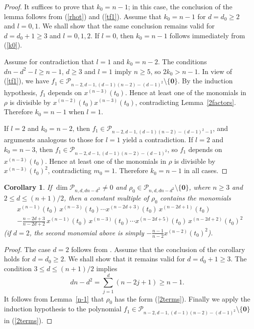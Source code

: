 \documentclass[11pt]{amsart}
\numberwithin{equation}{section}
\newtheorem{cor}[thm]{Corollary}
\newcommand{\scp}{\mathscr{P}}
\newcommand{\zero}{\mathbf{0}}
\begin{document}
\begin{proof}
  It suffices to prove that $k_0=n-1$; in this case, the conclusion of the lemma follows from (\ref{rhot}) and (\ref{tf1}). Assume that $k_0=n-1$ for $d=d_0\ge2$ and $l=0,1$. We shall show that the same conclusion remains valid for $d=d_0+1\ge3$ and $l=0,1,2$. If $l=0$, then $k_0=n-1$ follows immediately from (\ref{k0}).

Assume for contradiction that $l=1$ and $k_0=n-2$. The conditions $dn-d^2-l\ge n-1$, $d\ge3$ and $l=1$ imply $n\ge5$, so $2k_0>n-1$. In view of (\ref{tf1}), we have $f_1\in\scp_{n-2,d-1,(d-1)(n-2)-(d-1)^2}\setminus\{\zero\}$. By the induction hypothesis, $f_1$ depends on $x^{(n-3)}(t_0)$. Hence at least one of the monomials in $\rho$ is divisible by $x^{(n-2)}(t_0)x^{(n-3)}(t_0)$, contradicting Lemma~\ref{2factors}. Therefore $k_0=n-1$ when $l=1$.

If $l=2$ and $k_0=n-2$, then $f_1\in\scp_{n-2,d-1,(d-1)(n-2)-(d-1)^2-1}$, and arguments analogous to those for $l=1$ yield a contradiction. If $l=2$ and $k_0=n-3$, then $f_1\in\scp_{n-2,d-1,(d-1)(n-2)-(d-1)^2}$, so $f_1$ depends on $x^{(n-3)}(t_0)$. Hence at least one of the monomials in $\rho$ is divisible by $x^{(n-3)}(t_0)^2$, contradicting $m_0=1$. Therefore $k_0=n-1$ in all cases.
\end{proof}

\begin{cor} \label{2}
 If $\dim\scp_{n,d,dn-d^2}\neq0$ and $\rho_0\in\scp_{n,d,dn-d^2}\setminus\{\zero\}$, where $n\ge3$ and $2\le d\le(n+1)/2$, then a constant multiple of $\rho_0$ contains the monomials
\begin{align*}
    &x^{(n-1)}(t_0)\,x^{(n-3)}(t_0)\cdots x^{(n-2d+3)}(t_0)\,x^{(n-2d+1)}(t_0)\\
    &-\frac{n-2d+3}{n-2d+2}\,x^{(n-1)}(t_0)\,x^{(n-3)}(t_0)\cdots x^{(n-2d+5)}(t_0)\,x^{(n-2d+2)}(t_0)^2
\end{align*}
(if $d=2$, the second monomial above is simply $-\frac{n-1}{n-2}x^{(n-2)}(t_0)^2$).
\end{cor}
\begin{proof}
The case $d=2$ follows from \cite[Theorem 1.1]{wz}. Assume that the conclusion of the corollary holds for $d=d_0\ge2$. We shall show that it remains valid for $d=d_0+1\ge3$. The condition $3\le d\le(n+1)/2$ implies
\[
    dn-d^2=\sum_{j=1}^{d}(n-2j+1)\ge n-1.
\]
It follows from Lemma~\ref{n-1} that $\rho_0$ has the form (\ref{2terms}). Finally we apply the induction hypothesis to the polynomial $f_1\in\scp_{n-2,d-1,(d-1)(n-2)-(d-1)^2}\setminus\{\zero\}$ in (\ref{2terms}).
\end{proof}
\end{document}

